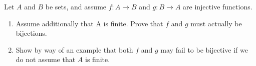 \documentclass[12pt,letterpaper,boxed]{hmcpset}
\begin{document}
\begin{solution}
\end{solution}

\begin{problem}[Exercise 4.17]
Let $A$ and $B$ be sets, and assume $f: A \rightarrow B$ and $g: B \rightarrow A$ are injective functions.
\vspace{-2mm}
\begin{enumerate}
	\itemsep0em
	\item Assume additionally that A is finite. Prove that $f$ and $g$ must actually be bijections.
	\item Show by way of an example that both $f$ and $g$ may fail to be bijective if we do not assume that $A$ is finite.
\end{enumerate}
\end{problem}

\begin{solution}
\end{solution}
\end{document}
